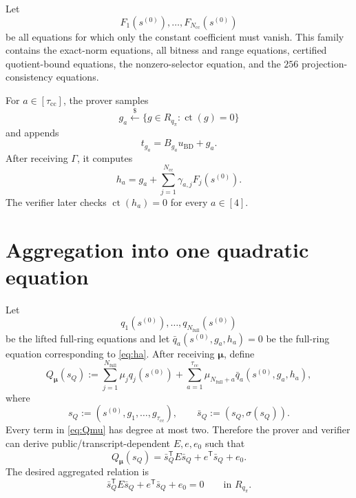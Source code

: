 \documentclass[11pt,a4paper]{article}
\newcommand{\Rpi}{R_{q_{\pi}}}
\newcommand{\ct}{\operatorname{ct}}
\newcommand{\getsr}{\xleftarrow{\$}}
\newcommand{\transpose}{\mathsf{T}}
\begin{document}
Let
\[
  F_1(s^{(0)}),\ldots,F_{N_{\mathrm{cc}}}(s^{(0)})
\]
be all equations for which only the constant coefficient must vanish.  This
family contains the exact-norm equations, all bitness and range equations,
certified quotient-bound equations, the nonzero-selector equation, and the
\(256\) projection-consistency equations.

For \(a\in[\tau_{\mathrm{cc}}]\), the prover samples
\[
  g_a\getsr\{g\in\Rpi:\ct(g)=0\}
\]
and appends
\[
  t_{g_a}=B_{g_a}u_{\mathrm{BD}}+g_a.
\]
After receiving \(\Gamma\), it computes
\begin{equation}
  h_a=g_a+\sum_{j=1}^{N_{\mathrm{cc}}}
       \gamma_{a,j}F_j(s^{(0)}).
  \label{eq:ha}
\end{equation}
The verifier later checks \(\ct(h_a)=0\) for every \(a\in[4]\).

\section{Aggregation into one quadratic equation}

Let
\[
  q_1(s^{(0)}),\ldots,q_{N_{\mathrm{full}}}(s^{(0)})
\]
be the lifted full-ring equations and let
\(\bar q_a(s^{(0)},g_a,h_a)=0\) be the full-ring equation corresponding to
\cref{eq:ha}.  After receiving \(\boldsymbol\mu\), define
\begin{equation}
 Q_{\boldsymbol\mu}(s_Q)
  :=\sum_{j=1}^{N_{\mathrm{full}}}\mu_jq_j(s^{(0)})
   +\sum_{a=1}^{\tau_{\mathrm{cc}}}
       \mu_{N_{\mathrm{full}}+a}\bar q_a(s^{(0)},g_a,h_a),
 \label{eq:Qmu}
\end{equation}
where
\[
  s_Q:=(s^{(0)},g_1,\ldots,g_{\tau_{\mathrm{cc}}}),
  \qquad
  \bar s_Q:=(s_Q,\sigma(s_Q)).
\]
Every term in \cref{eq:Qmu} has degree at most two.  Therefore the prover and
verifier can derive public/transcript-dependent \(E,e,e_0\) such that
\begin{equation}
  Q_{\boldsymbol\mu}(s_Q)
  =\bar s_Q^{\transpose}E\bar s_Q+e^{\transpose}\bar s_Q+e_0.
  \label{eq:quadratic-matrix-form}
\end{equation}
The desired aggregated relation is
\begin{equation}
  \bar s_Q^{\transpose}E\bar s_Q+e^{\transpose}\bar s_Q+e_0=0
  \qquad\text{in }\Rpi.
  \label{eq:one-quadratic-relation}
\end{equation}
\end{document}
